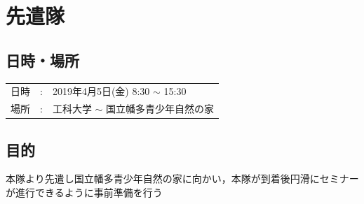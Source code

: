 %
\section{先遣隊}

\subsection{日時・場所}

\begin{tabular}{p{}rp{}}
  日時 & : & 2019年4月5日(金) 8:30 $\sim$ 15:30\\
  場所 & : & 工科大学 $\sim$ 国立幡多青少年自然の家
\end{tabular}

\subsection{目的}
本隊より先遣し国立幡多青少年自然の家に向かい，本隊が到着後円滑にセミナーが進行できるように事前準備を行う

